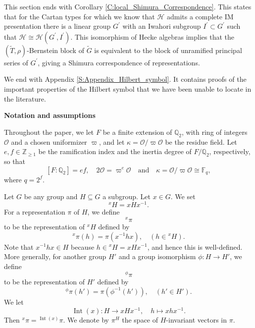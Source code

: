 \documentclass[10pt, letterpaper]{amsart}
\theoremstyle{plain}
\theoremstyle{definition}
\numberwithin{equation}{section}
\newcommand{\F}{\mathbb{F}}
\newcommand{\Q}{\mathbb{Q}}
\newcommand{\Z}{\mathbb{Z}}
\newcommand{\Gt}{\widetilde{G}}
\newcommand{\Tt}{\widetilde{T}}
\newcommand{\Int}{\operatorname{Int}}
\newcommand{\Ocal}{\mathcal{O}}
\newcommand{\Hcal}{\mathcal{H}}
\newcommand{\qand}{{\quad\text{and}\quad}}
\begin{document}
This section ends with Corollary \ref{C:local_Shimura_Correspondence}. This states that for the Cartan types for which we know that $\Hcal$ admits a complete IM presentation there is a linear group $G^{\prime}$ with an Iwahori subgroup $I^{\prime}\subset G^{\prime}$ such that $\Hcal\cong \Hcal(G^{\prime},I^{\prime})$. This isomorphism of Hecke algebras implies that the $(\Tt,\rho)$-Bernstein block of $\Gt$ is equivalent to the block of unramified principal series of $G^{\prime}$, giving a Shimura correspondence of representations.

We end with Appendix \ref{S:Appendix_Hilbert_symbol}. It contains proofs of the important properties of the Hilbert symbol that we have been unable to locate in the literature. 



\quad

\begin{center}{\bf Notation and assumptions}\end{center}

Throughout the paper, we let $F$ be a finite extension of $\Q_2$, with ring of integers $\Ocal$ and a chosen uniformizer $\varpi$, and let $\kappa=\Ocal\slash\varpi\Ocal$ be the residue field. Let $e, f\in\Z_{\geq 1}$ be the ramification index and the inertia degree of $F\slash\Q_2$, respectively, so that
\[
[F:\Q_2]=ef,\quad 2\Ocal=\varpi^e\Ocal\qand \kappa=\Ocal\slash\varpi\Ocal\cong \F_{q},
\]
where $q=2^f$.

Let $G$ be any group and $H\subseteq G$ a subgroup. Let $x\in G$. We set
\[
^xH=xHx^{-1}.
\]
For a representation $\pi$ of $H$, we define
\[
^x\pi
\]
to be the representation of ${^xH}$ defined by
\[
^x\pi(h)=\pi(x^{-1}hx),\quad (h\in {^xH}).
\]
Note that $x^{-1}hx\in H$ because $h\in{^xH}=xHx^{-1}$, and hence this is well-defined. More generally, for another group $H'$ and a group isomorphism $\phi:H\to H'$, we define 
\[
^\phi\pi
\]
to be the representation of $H'$ defined by
\begin{equation}\label{E:definition_phi_pi}
^\phi\pi(h')=\pi(\phi^{-1}(h')),\quad(h'\in H').
\end{equation}
We let
\[
\Int(x):H\longrightarrow xHx^{-1},\quad h\mapsto xhx^{-1}.
\]
Then $^x\pi={^{\Int(x)}}\pi$. We denote by $\pi^H$ the space of $H$-invariant vectors in $\pi$.

\end{document}
